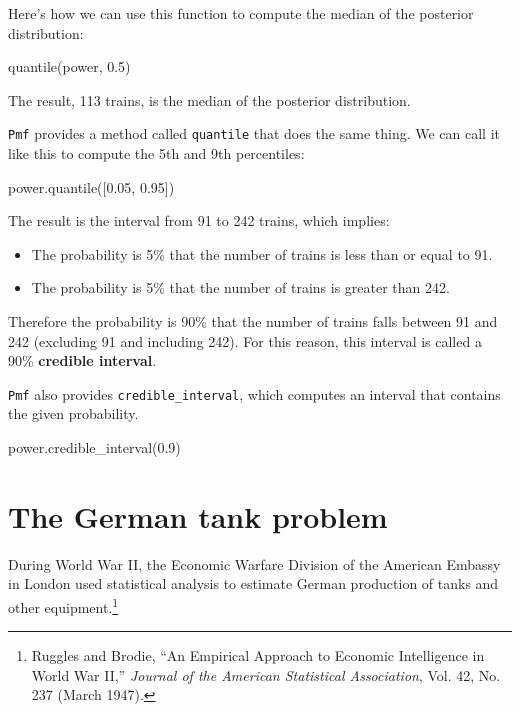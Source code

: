 \documentclass[12pt]{book}
\theoremstyle{exercise}
\newcommand{\py}[1]{{\tt #1}}%
\begin{document}
Here's how we can use this function to compute the median of the posterior distribution:

\begin{code}
quantile(power, 0.5)
\end{code}

The result, 113 trains, is the median of the posterior distribution.

\py{Pmf} provides a method called \py{quantile} that does the same thing.
We can call it like this to compute the 5th and 9th percentiles:

\begin{code}
power.quantile([0.05, 0.95])
\end{code}

The result is the interval from 91 to 242 trains, which implies:

\begin{itemize}

\item The probability is 5\% that the number of trains is less than or equal to 91.

\item The probability is 5\% that the number of trains is greater than 242.

\end{itemize}

Therefore the probability is 90\% that the number of trains falls between 91 and 242 (excluding 91 and including 242).
For this reason, this interval is called a 90\% {\bf credible interval}.

\py{Pmf} also provides \py{credible_interval}, which computes an interval that contains the given probability.

\begin{code}
power.credible_interval(0.9)
\end{code}




\section{The German tank problem}

During World War II, the Economic Warfare Division of the American
Embassy in London used statistical analysis to estimate German
production of tanks and other equipment.\footnote{Ruggles and Brodie,
  ``An Empirical Approach to Economic Intelligence in World War II,''
  {\em Journal of the American Statistical Association}, Vol. 42,
  No. 237 (March 1947).}
\end{document}
